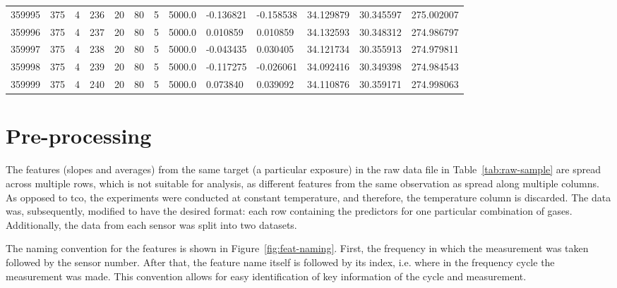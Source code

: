 \begin{table}
{\begin{tabular}{p{1.5cm}p{1.3cm}p{0.8cm}p{1.3cm}p{0.8cm}p{0.8cm}p{1.8cm}p{1.8cm}p{1.8cm}p{1.8cm}p{1.8cm}p{1.8cm}p{1.8cm}}
		359995 &          375 &         4 &        236 &        20 &         80 &          5 &     5000.0 &              -0.136821 &              -0.158538 &                34.129879 &                30.345597 &              275.002007 \\
		359996 &          375 &         4 &        237 &        20 &         80 &          5 &     5000.0 &               0.010859 &               0.010859 &                34.132593 &                30.348312 &              274.986797 \\
		359997 &          375 &         4 &        238 &        20 &         80 &          5 &     5000.0 &              -0.043435 &               0.030405 &                34.121734 &                30.355913 &              274.979811 \\
		359998 &          375 &         4 &        239 &        20 &         80 &          5 &     5000.0 &              -0.117275 &              -0.026061 &                34.092416 &                30.349398 &              274.984543 \\
		359999 &          375 &         4 &        240 &        20 &         80 &          5 &     5000.0 &               0.073840 &               0.039092 &                34.110876 &                30.359171 &              274.998063 \\
		\bottomrule[0.5mm]
	\end{tabular}}
\end{table}

\newpage
\section{Pre-processing}
\label{sec:preprocessing}

The features (slopes and averages) from the same target (a particular exposure) in the raw data file in Table~\ref{tab:raw-sample} are spread across multiple rows, which is not suitable for analysis, as different features from the same observation as spread along multiple columns. As opposed to \acrshort{tco}, the experiments were conducted at constant temperature, and therefore, the temperature column is discarded. The data was, subsequently, modified to have the desired format: each row containing the predictors for one particular combination of gases. Additionally, the data from each sensor was split into  two datasets. 

The naming convention for the features is shown in Figure~\ref{fig:feat-naming}. First, the frequency in which the measurement was taken followed by the sensor number. After that, the feature name itself is followed by its index, i.e. where in the frequency cycle the measurement was made. This convention allows for easy identification of key information of the cycle and measurement.

